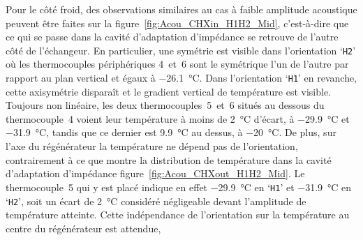 Pour le côté froid, des observations similaires au cas à faible amplitude acoustique peuvent être faites sur la figure~\ref{fig:Acou_CHXin_H1H2_Mid}, c'est-à-dire que ce qui se passe dans la cavité d'adaptation d'impédance se retrouve de l'autre côté de l'échangeur. En particulier, une symétrie est visible dans l'orientation `\texttt{H2}' où les thermocouples périphériques 4~et~6 sont le symétrique l'un de l'autre par rapport au plan vertical et égaux à \qty{-26.1}{\degreeCelsius}. Dans l'orientation `\texttt{H1}' en revanche, cette axisymétrie disparaît et le gradient vertical de température est visible. Toujours non linéaire, les deux thermocouples~5~et~6 situés au dessous du thermocouple~4 voient leur température à moins de \qty{2}{\degreeCelsius} d'écart, à \qty{-29.9}{\degreeCelsius} et \qty{-31.9}{\degreeCelsius}, tandis que ce dernier est \qty{9.9}{\degreeCelsius} au dessus, à \qty{-20}{\degreeCelsius}.
De plus, sur l'axe du régénérateur la température ne dépend pas de l'orientation, contrairement à ce que montre la distribution de température dans la cavité d'adaptation d'impédance figure~\ref{fig:Acou_CHXout_H1H2_Mid}. Le thermocouple~5 qui y est placé indique en effet \qty{-29,9}{\degreeCelsius} en `\texttt{H1}' et \qty{-31.9}{\degreeCelsius} en `\texttt{H2}', soit un écart de \qty{2}{\degreeCelsius} considéré négligeable devant l'amplitude de température atteinte. Cette indépendance de l'orientation sur la température au centre du régénérateur est attendue, 

%    

